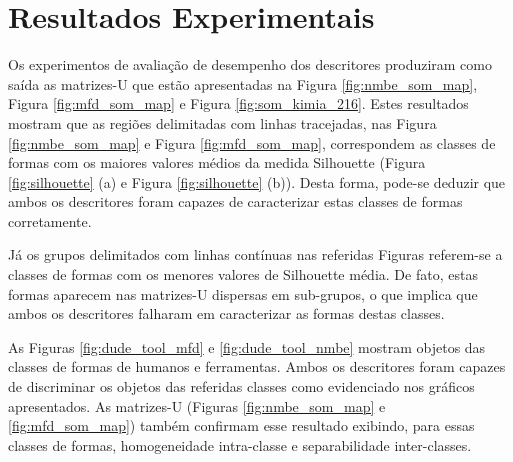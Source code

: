 


\section{Resultados Experimentais}

Os experimentos de avaliação de desempenho dos descritores produziram como saída as matrizes-U que estão apresentadas na Figura \ref{fig:nmbe_som_map}, Figura \ref{fig:mfd_som_map} e  Figura \ref{fig:som_kimia_216}. Estes resultados mostram que as regiões delimitadas com linhas tracejadas, nas Figura \ref{fig:nmbe_som_map} e Figura \ref{fig:mfd_som_map}, correspondem as classes de formas com os maiores valores médios da medida Silhouette (Figura \ref{fig:silhouette} (a) e Figura \ref{fig:silhouette} (b)). Desta forma, pode-se deduzir que ambos os descritores foram capazes de caracterizar estas classes de formas corretamente.

Já os grupos delimitados com linhas contínuas nas referidas Figuras referem-se a classes de formas com os menores valores de Silhouette média. De fato, estas formas aparecem nas matrizes-U dispersas em sub-grupos, o que implica que ambos os descritores falharam em caracterizar as formas destas classes.
  
As Figuras \ref{fig:dude_tool_mfd} e \ref{fig:dude_tool_nmbe} mostram objetos das classes de formas de humanos e ferramentas. Ambos os descritores foram capazes de discriminar os objetos das referidas classes como evidenciado nos gráficos apresentados. As matrizes-U (Figuras \ref{fig:nmbe_som_map} e \ref{fig:mfd_som_map}) também confirmam esse resultado exibindo, para essas classes de formas, homogeneidade intra-classe e separabilidade inter-classes.

